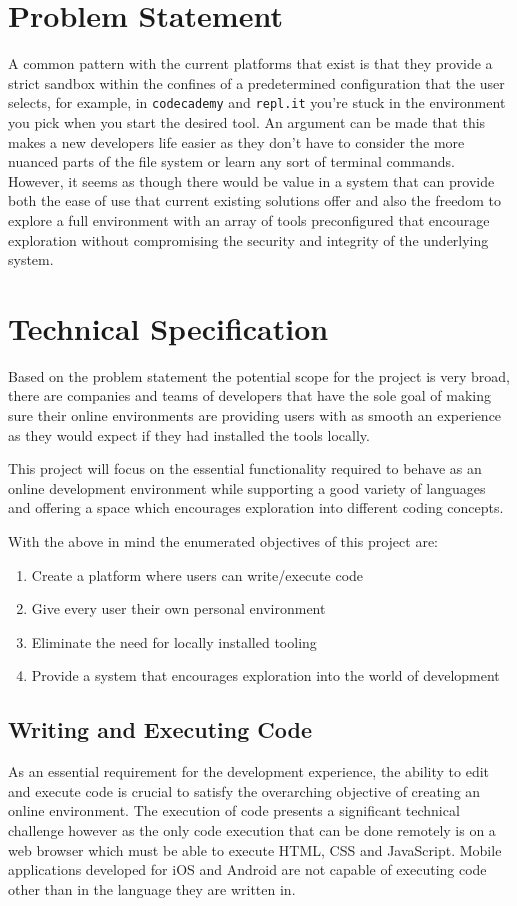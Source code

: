 \section{Problem Statement} \label{section:probart-probstate}
A common pattern with the current platforms that exist is that they provide a strict sandbox within the confines of a predetermined configuration that the user selects, for example, in \texttt{codecademy} and \texttt{repl.it} you're stuck in the environment you pick when you start the desired tool. An argument can be made that this makes a new developers life easier as they don't have to consider the more nuanced parts of the file system or learn any sort of terminal commands. However, it seems as though there would be value in a system that can provide both the ease of use that current existing solutions offer and also the freedom to explore a full environment with an array of tools preconfigured that encourage exploration without compromising the security and integrity of the underlying system.

\section{Technical Specification} \label{section:probart-techspec}
Based on the problem statement the potential scope for the project is very broad, there are companies and teams of developers that have the sole goal of making sure their online environments are providing users with as smooth an experience as they would expect if they had installed the tools locally.

This project will focus on the essential functionality required to behave as an online development environment while supporting a good variety of languages and offering a space which encourages exploration into different coding concepts.

With the above in mind the enumerated objectives of this project are: 
\begin{enumerate}
    \item Create a platform where users can write/execute code
    \item Give every user their own personal environment
    \item Eliminate the need for locally installed tooling
    \item Provide a system that encourages exploration into the world of development
\end{enumerate}

\subsection{Writing and Executing Code}
As an essential requirement for the development experience, the ability to edit and execute code is crucial to satisfy the overarching objective of creating an online environment. The execution of code presents a significant technical challenge however as the only code execution that can be done remotely is on a web browser which must be able to execute HTML, CSS and JavaScript. Mobile applications developed for iOS and Android are not capable of executing code other than in the language they are written in.

